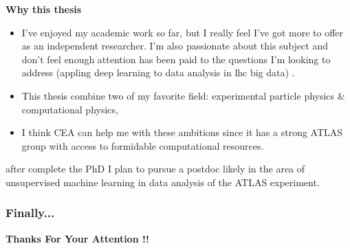 \documentclass[11pt,aspectratio=169]{beamer}
\begin{document}
\begin{frame}{\underline{\secname}}
	

	\begin{center}
		\textbf{Why this thesis}
	\end{center}
				\begin{itemize}			  \setlength\itemsep{0em}
\item
I’ve enjoyed my academic work so far, but I really feel I’ve got more to offer as an independent researcher. I’m also passionate about this subject and don’t feel enough attention has been paid to the questions I’m looking to address (appling deep learning to data analysis in lhc big data) .
\item

	
	This thesis combine two of my favorite field: experimental particle physics \& computational physics,
\item
	
I think CEA can help me with these ambitions since it has a strong ATLAS group with access to formidable computational resources.	
\end{itemize}

	\begin{center}
		\textbf{}
	\end{center}
	after complete the PhD I plan to pursue a postdoc likely in the area of unsupervised machine learning in data analysis of the ATLAS experiment.
\end{frame}





{
\begin{frame}\frametitle{{\color{white}Finally...}}


\centering

{\vspace{17em} \Huge {\color{white}	\textbf{Thanks For Your Attention !!}\\}}
\end{frame}

}


\end{document}
